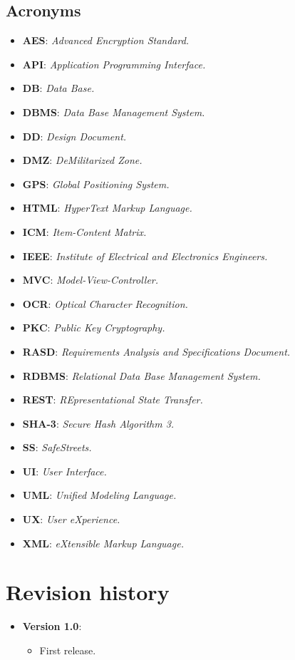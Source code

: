 \documentclass[12pt,a4paper]{report}
\begin{document}
			\subsection{Acronyms}
				\begin{itemize}
				\item \textbf{AES}: \emph{Advanced Encryption Standard.}
				\item \textbf{API}: \emph{Application Programming Interface.}
				\item \textbf{DB}: \emph{Data Base.}			
				\item \textbf{DBMS}: \emph{Data Base Management System.}
				\item \textbf{DD}: \emph{Design Document.}
				\item \textbf{DMZ}: \emph{DeMilitarized Zone.}
				\item \textbf{GPS}: \emph{Global Positioning System.}
				\item \textbf{HTML}: \emph{HyperText Markup Language.}
				\item \textbf{ICM}: \emph{Item-Content Matrix.}
				\item \textbf{IEEE}: \emph{Institute of Electrical and Electronics Engineers.}
				\item \textbf{MVC}: \emph{Model-View-Controller.}
				\item \textbf{OCR}: \emph{Optical Character Recognition.}
				\item \textbf{PKC}: \emph{Public Key Cryptography.}
				\item \textbf{RASD}: \emph{Requirements Analysis and Specifications Document.}
				\item \textbf{RDBMS}: \emph{Relational Data Base Management System.}
				\item \textbf{REST}: \emph{REpresentational State Transfer.}
				\item \textbf{SHA-3}: \emph{Secure Hash Algorithm 3.}	
				\item \textbf{SS}: \emph{SafeStreets.}	
				\item \textbf{UI}: \emph{User Interface.}
				\item \textbf{UML}: \emph{Unified Modeling Language.}
				\item \textbf{UX}: \emph{User eXperience.}
				\item \textbf{XML}: \emph{eXtensible Markup Language.}
				\end{itemize}
		\section{Revision history}
			\begin{itemize}
				\item \textbf{Version 1.0}:
				\begin{itemize}
					\item First release.
				\end{itemize}
			\end {itemize}
\end{document}
